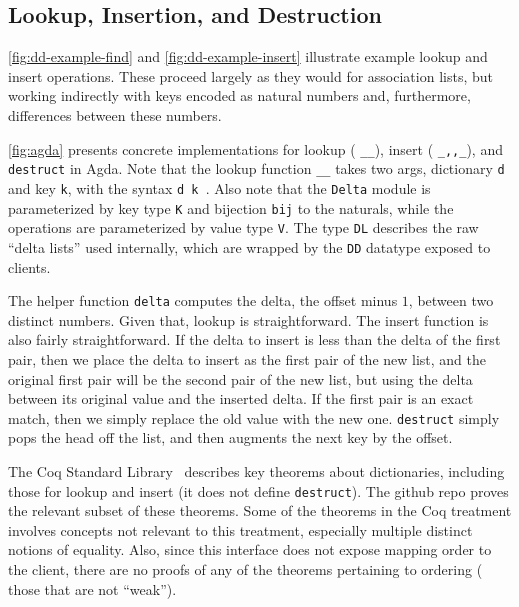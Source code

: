 \subsection{Lookup, Insertion, and Destruction}
\label{sec:DD:basics}



\autoref{fig:dd-example-find} and \autoref{fig:dd-example-insert} illustrate example lookup and insert operations.
%
These proceed largely as they would for association lists, but working indirectly with keys encoded as natural numbers and, furthermore, differences between these numbers.

\autoref{fig:agda} presents concrete implementations for lookup (\ie{} \texttt{\_\altLAng\_\altRAng}), insert (\ie{} \texttt{\_,,\_}), and \texttt{destruct} in Agda.
%
Note that the lookup function \texttt{\_\altLAng\_\altRAng} takes two args, dictionary \texttt{d} and key \texttt{k}, with the syntax \texttt{d \altLAng{} k \altRAng}.
%
Also note that the \texttt{Delta} module is parameterized by key type \verb+K+ and bijection \verb+bij+ to the naturals, while the operations are parameterized by value type \verb+V+.
%
%
The type \verb+DL+ describes the raw ``delta lists'' used internally, which are wrapped by the \verb+DD+ datatype exposed to clients.

The helper function \verb+delta+ computes the delta, \ie{} the offset minus $1$, between two distinct numbers.
%
Given that, lookup is straightforward. The insert function is also fairly straightforward.
%
If the delta to insert is less than the delta of the first pair, then we place the delta to insert as the first pair of the new list, and
%
the original first pair will be the second pair of the new list, but using the delta between its original value and the inserted delta.
%
If the first pair is an exact match, then we simply replace the old value with the new one.
%
\verb+destruct+ simply pops the head off the list, and then augments the next key by the offset.

%
The Coq Standard Library~\citep{FMapInterface,FMapFacts} describes key theorems about dictionaries, including those for lookup and insert (it does not define \verb+destruct+).
%
The github repo \citep{github:agda} proves the relevant subset of these theorems. Some of the theorems in the Coq treatment involves concepts not relevant to this treatment,
%
especially multiple distinct notions of equality. Also, since this interface does not expose mapping order to the client,
%
there are no proofs of any of the theorems pertaining to ordering (\ie{} those that are not ``weak'').


